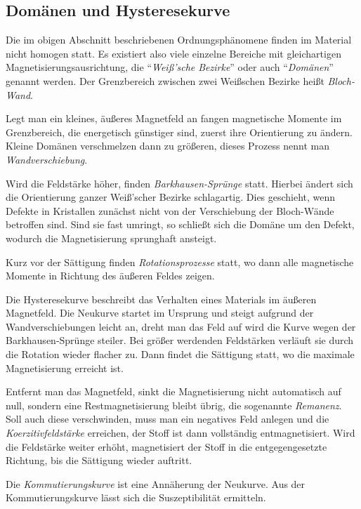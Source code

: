 \documentclass[12pt,a4paper]{scrartcl}
\numberwithin{equation}{section} %
\renewcommand{\[}{} %
\renewcommand{\]}{\noindent} %
\begin{document}
\hypertarget{domuxe4nen-und-hysteresekurve}{%
\subsection{Domänen und Hysteresekurve}\label{domuxe4nen-und-hysteresekurve}}
Die im obigen Abschnitt beschriebenen Ordnungsphänomene finden im Material nicht homogen statt. Es existiert also viele einzelne Bereiche mit gleichartigen Magnetisierungsausrichtung, die ``\emph{Weiß'sche Bezirke}'' oder auch ``\emph{Domänen}'' genannt werden. Der Grenzbereich zwischen zwei Weißschen Bezirke heißt \emph{Bloch-Wand}.

Legt man ein kleines, äußeres Magnetfeld an fangen magnetische Momente im Grenzbereich, die energetisch günstiger sind, zuerst ihre Orientierung zu ändern. Kleine Domänen verschmelzen dann zu größeren, dieses Prozess nennt man \emph{Wandverschiebung}.

Wird die Feldstärke höher, finden \emph{Barkhausen-Sprünge} statt. Hierbei ändert sich die Orientierung ganzer Weiß'scher Bezirke schlagartig. Dies geschieht, wenn Defekte in Kristallen zunächst nicht von der Verschiebung der Bloch-Wände betroffen sind. Sind sie fast umringt, so schließt sich die Domäne um den Defekt, wodurch die Magnetisierung sprunghaft ansteigt.

Kurz vor der Sättigung finden \emph{Rotationsprozesse} statt, wo dann alle magnetische Momente in Richtung des äußeren Feldes zeigen.

Die Hysteresekurve beschreibt das Verhalten eines Materials im äußeren Magnetfeld. Die Neukurve startet im Ursprung und steigt aufgrund der Wandverschiebungen leicht an, dreht man das Feld auf wird die Kurve wegen der Barkhausen-Sprünge steiler. Bei größer werdenden Feldstärken verläuft sie durch die Rotation wieder flacher zu. Dann findet die Sättigung statt, wo die maximale Magnetisierung erreicht ist.

Entfernt man das Magnetfeld, sinkt die Magnetisierung nicht automatisch auf null, sondern eine Restmagnetisierung bleibt übrig, die sogenannte \emph{Remanenz}. Soll auch diese verschwinden, muss man ein negatives Feld anlegen und die \emph{Koerzitivfeldstärke} erreichen, der Stoff ist dann vollständig entmagnetisiert. Wird die Feldstärke weiter erhöht, magnetisiert der Stoff in die entgegengesetzte Richtung, bis die Sättigung wieder auftritt.

Die \emph{Kommutierungskurve} ist eine Annäherung der Neukurve. Aus der Kommutierungskurve lässt sich die Suszeptibilität ermitteln.
\end{document}
